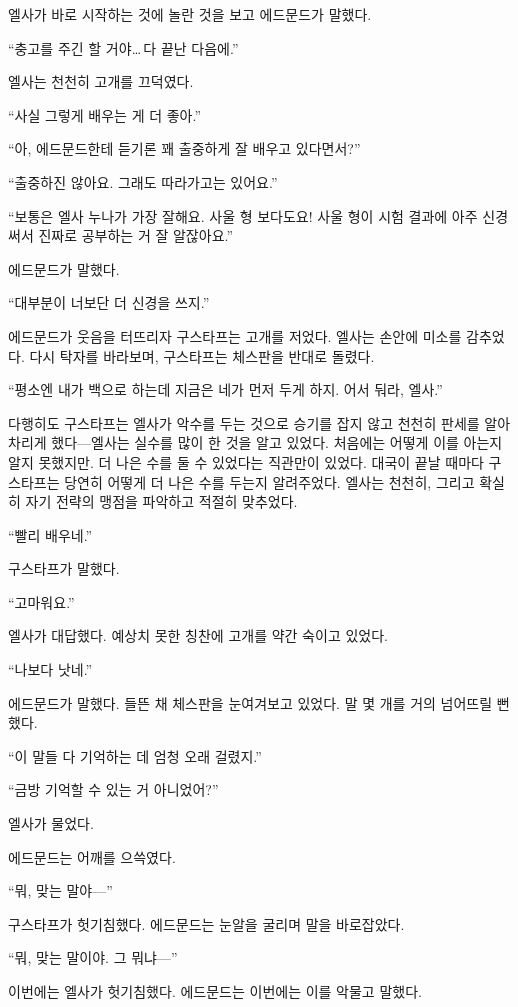 엘사가 바로 시작하는 것에 놀란 것을 보고 에드문드가 말했다.

``충고를 주긴 할 거야\ldots\,다 끝난 다음에.''

엘사는 천천히 고개를 끄덕였다.

``사실 그렇게 배우는 게 더 좋아.''

``아, 에드문드한테 듣기론 꽤 출중하게 잘 배우고 있다면서?''

``출중하진 않아요. 그래도 따라가고는 있어요.''

``보통은 엘사 누나가 가장 잘해요. 사울 형 보다도요! 사울 형이 시험 결과에 아주 신경 써서 진짜로 공부하는 거 잘 알잖아요.''

에드문드가 말했다.

``대부분이 너보단 더 신경을 쓰지.''

에드문드가 웃음을 터뜨리자 구스타프는 고개를 저었다. 엘사는 손안에 미소를 감추었다. 다시 탁자를 바라보며, 구스타프는 체스판을 반대로 돌렸다.

``평소엔 내가 백으로 하는데 지금은 네가 먼저 두게 하지. 어서 둬라, 엘사.''

다행히도 구스타프는 엘사가 악수를 두는 것으로 승기를 잡지 않고 천천히 판세를 알아차리게 했다—엘사는 실수를 많이 한 것을 알고 있었다. 처음에는 어떻게 이를 아는지 알지 못했지만. 더 나은 수를 둘 수 있었다는 직관만이 있었다. 대국이 끝날 때마다 구스타프는 당연히 어떻게 더 나은 수를 두는지 알려주었다. 엘사는 천천히, 그리고 확실히 자기 전략의 맹점을 파악하고 적절히 맞추었다.

``빨리 배우네.''

구스타프가 말했다.

``고마워요.''

엘사가 대답했다. 예상치 못한 칭찬에 고개를 약간 숙이고 있었다.

``나보다 낫네.''

에드문드가 말했다. 들뜬 채 체스판을 눈여겨보고 있었다. 말 몇 개를 거의 넘어뜨릴 뻔했다.

``이 말들 다 기억하는 데 엄청 오래 걸렸지.''

``금방 기억할 수 있는 거 아니었어?''

엘사가 물었다.

에드문드는 어깨를 으쓱였다.

``뭐, 맞는 말야—''

구스타프가 헛기침했다. 에드문드는 눈알을 굴리며 말을 바로잡았다.

``뭐, 맞는 말이야. 그 뭐냐—''

이번에는 엘사가 헛기침했다. 에드문드는 이번에는 이를 악물고 말했다.

